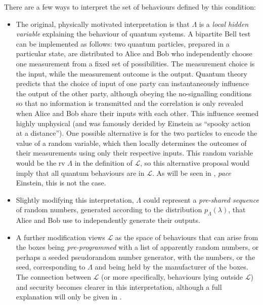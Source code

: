 \documentclass[10pt, a4paper]{article}
\numberwithin{equation}{section} %
\theoremstyle{definition}
\theoremstyle{plain}
\newcommand{\?}{\mathrel{?}} %
\newcommand{\Ls}{\mathcal{L}}
\begin{document}
    There are a few ways to interpret the set of behaviours defined by this condition:
    \begin{itemize}
      \item The original, physically motivated interpretation is that \(\Lambda\) is a \emph{local hidden variable} explaining the behaviour of quantum systems. A bipartite Bell test can be implemented as follows: two quantum particles, prepared in a particular state, are distributed to Alice and Bob who independently choose one measurement from a fixed set of possibilities. The measurement choice is the input, while the measurement outcome is the output. Quantum theory predicts that the choice of input of one party can instantaneously influence the output of the other party, although obeying the no-signalling conditions so that no information is transmitted and the correlation is only revealed when Alice and Bob share their inputs with each other. This influence seemed highly unphysical (and was famously derided by Einstein as ``spooky action at a distance''). One possible alternative is for the two particles to encode the value of a random variable, which then locally determines the outcomes of their measurements using only their respective inputs. This random variable would be the rv \(\Lambda\) in the definition of \(\Ls\), so this alternative proposal would imply that all quantum behaviours are in \(\Ls\). As will be seen in , \emph{pace} Einstein, this is not the case.
      \item Slightly modifying this interpretation, \(\Lambda\) could represent a \emph{pre-shared sequence} of random numbers, generated according to the distribution \(p_{\Lambda}(\lambda)\), that Alice and Bob use to independently generate their outputs.
      \item A further modification views \(\Ls\) as the space of behaviours that can arise from the boxes being \emph{pre-programmed} with a list of apparently random numbers, or perhaps a seeded pseudorandom number generator, with the numbers, or the seed, corresponding to \(\Lambda\) and being held by the manufacturer of the boxes. The connection between \(\Ls\) (or more specifically, behaviours lying outside \(\Ls\)) and security becomes clearer in this interpretation, although a full explanation will only be given in .
    \end{itemize}
\end{document}
